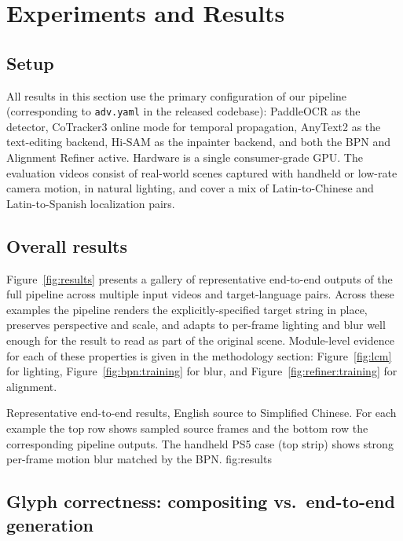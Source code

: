 \section{Experiments and Results}
\label{sec:experiments}

\subsection{Setup}
\label{sec:exp:setup}

All results in this section use the primary configuration of our
pipeline (corresponding to \texttt{adv.yaml} in the released
codebase): PaddleOCR as the detector, CoTracker3 online mode for
temporal propagation, AnyText2 as the text-editing backend, Hi-SAM
as the inpainter backend, and both the BPN and Alignment Refiner
active. Hardware is a single consumer-grade GPU. The evaluation
videos consist of real-world scenes captured with handheld or
low-rate camera motion, in natural lighting, and cover a mix of
Latin-to-Chinese and Latin-to-Spanish localization pairs.

\subsection{Overall results}
\label{sec:exp:overall}

Figure~\ref{fig:results} presents a gallery of representative
end-to-end outputs of the full pipeline across multiple input
videos and target-language pairs. Across these examples the
pipeline renders the explicitly-specified target string in place,
preserves perspective and scale, and adapts to per-frame lighting
and blur well enough for the result to read as part of the
original scene.
Module-level evidence for each of these properties is given in the
methodology section: Figure~\ref{fig:lcm} for lighting,
Figure~\ref{fig:bpn:training} for blur, and
Figure~\ref{fig:refiner:training} for alignment.

%
  {Representative end-to-end results, English source to Simplified
   Chinese. For each example the top row shows sampled source
   frames and the bottom row the corresponding pipeline outputs.
   The handheld PS5 case (top strip) shows strong per-frame motion
   blur matched by the BPN.}%
  {fig:results}

\subsection{Glyph correctness: compositing vs.\ end-to-end generation}
\label{sec:exp:glyph}

